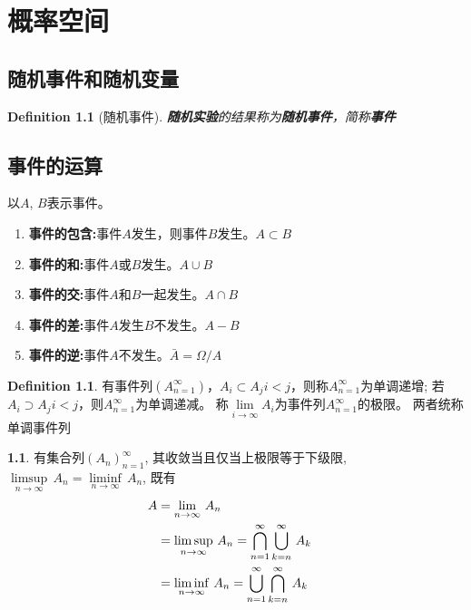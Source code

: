 \chapter{概率空间}

\section{随机事件和随机变量}
\newtheorem{randomized_event}[theorem_root]{Definition}

\begin{randomized_event}[随机事件]
{\bf 随机实验}的结果称为{\bf 随机事件}，简称{\bf 事件}
\end{randomized_event}

\section{事件的运算}
\theoremstyle{definition}
\newtheorem{monotoneeventcolumn}[theorem_root]{Definition}

\indent 以$A$, $B$表示事件。

\begin{enumerate}
\item{\bf 事件的包含:}\quad 事件$A$发生，则事件$B$发生。\equalwith$A\subset B$
\item{\bf 事件的和:}\quad 事件$A$或$B$发生。\equalwith$A\cup B$
\item{\bf 事件的交:}\quad 事件$A$和$B$一起发生。\equalwith$A\cap B$
\item{\bf 事件的差:}\quad 事件$A$发生$B$不发生。\equalwith$A - B$
\item{\bf 事件的逆:}\quad 事件$A$不发生。\equalwith${\bar A} = \Omega/A$
\end{enumerate}

\begin{monotoneeventcolumn}
    有事件列$(A_{n=1}^{\infty})$，$A_i\subset A_j$\equalwith$i<j$，则称$A_{n=1}^{\infty}$为单调递增; 若%
    $A_i\supset A_j$\equalwith$i<j$，则$A_{n=1}^{\infty}$为单调递减。%
    称$\lim\limits_{i\to\infty}A_i$为事件列$A_{n=1}^{\infty}$的极限。%
    两者统称单调事件列
\end{monotoneeventcolumn}

\newtheorem{limit_of_set}[theorem_root]{}
\begin{limit_of_set}
有集合列\((A_n)_{n=1}^\infty\), 其收敛当且仅当上极限等于下级限, \(\limsup\limits_{n\to\infty}\,A_n = \liminf\limits_{n\to\infty}\, A_n\), 既有
\begin{align*}
A &= \lim\limits_{n\to\infty}\,A_n\cr
  &= \limsup\limits_{n\to\infty}\,A_n = \bigcap\limits_{n=1}^\infty\bigcup\limits_{k=n}^\infty\,A_k\cr
  &= \liminf\limits_{n\to\infty}\,A_n = \bigcup\limits_{n=1}^\infty\bigcap\limits_{k=n}^\infty\,A_k
\end{align*}
\end{limit_of_set}

